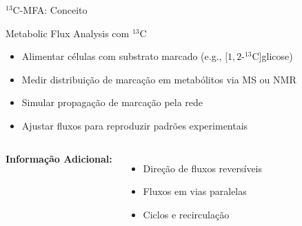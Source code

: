 \begin{frame}{$^{13}$C-MFA: Conceito}
\begin{block}{Metabolic Flux Analysis com $^{13}$C}
\begin{itemize}
    \item Alimentar células com substrato marcado (e.g., $[1,2\text{-}^{13}$C]glicose)
    \item Medir distribuição de marcação em metabólitos via MS ou NMR
    \item Simular propagação de marcação pela rede
    \item Ajustar fluxos para reproduzir padrões experimentais
\end{itemize}
\end{block}

\vspace{0.3cm}

\begin{columns}
\textbf{Informação Adicional:}
\begin{itemize}
    \item Direção de fluxos reversíveis
    \item Fluxos em vias paralelas
    \item Ciclos e recirculação
\end{itemize}

\begin{center}
\end{center}
\end{columns}
\end{frame}

